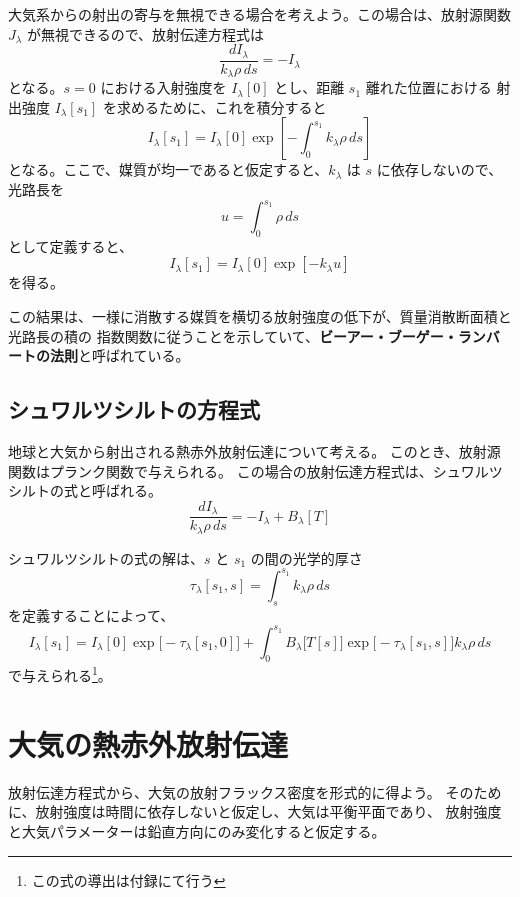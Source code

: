\documentclass[book]{dennou777}
\newcommand{\hmemph}[1]{\textbf{#1}}
\begin{document}
大気系からの射出の寄与を無視できる場合を考えよう。この場合は、放射源関数 $J_\lambda$
が無視できるので、放射伝達方程式は
\begin{equation}
	\frac{dI_\lambda}{k_\lambda\rho\,ds}=-I_\lambda
\end{equation}
となる。$s=0$ における入射強度を $I_\lambda[0]$ とし、距離 $s_1$ 離れた位置における
射出強度 $I_\lambda[s_1]$ を求めるために、これを積分すると
\begin{equation}
	I_\lambda[s_1]=I_\lambda[0]\exp[-\int^{s_1}_0 k_\lambda\rho\,ds]
\end{equation}
となる。ここで、媒質が均一であると仮定すると、$k_\lambda$ は $s$ に依存しないので、光路長を
\begin{equation}
	u=\int^{s_1}_0\rho\,ds
\end{equation}
として定義すると、
\begin{equation}
	I_\lambda[s_1]=I_\lambda[0]\exp[-k_\lambda u]
\end{equation}
を得る。

この結果は、一様に消散する媒質を横切る放射強度の低下が、質量消散断面積と光路長の積の
指数関数に従うことを示していて、\hmemph{ビーアー・ブーゲー・ランバートの法則}と呼ばれている。


\subsection{シュワルツシルトの方程式}
地球と大気から射出される熱赤外放射伝達について考える。
このとき、放射源関数はプランク関数で与えられる。
この場合の放射伝達方程式は、シュワルツシルトの式と呼ばれる。
\begin{equation}
	\frac{dI_\lambda}{k_\lambda\rho\,ds}=-I_\lambda+B_\lambda[T]
\end{equation}

シュワルツシルトの式の解は、$s$ と $s_1$ の間の光学的厚さ
\begin{equation}
	\tau_\lambda[s_1,s]=\int^{s_1}_s k_\lambda\rho\,ds
\end{equation}
を定義することによって、
\begin{equation}
	I_\lambda[s_1]=I_\lambda[0]\exp\bigl[-\tau_\lambda[s_1,0]\bigr]+
	\int^{s_1}_{0}B_\lambda\bigl[T[s]\bigr]\exp\bigl[-\tau_\lambda[s_1,s]\bigr]k_\lambda\rho\,ds
\end{equation}
で与えられる\footnote{この式の導出は付録にて行う}。


\section{大気の熱赤外放射伝達}
放射伝達方程式から、大気の放射フラックス密度を形式的に得よう。
そのために、放射強度は時間に依存しないと仮定し、大気は平衡平面であり、
放射強度と大気パラメーターは鉛直方向にのみ変化すると仮定する。
\end{document}
